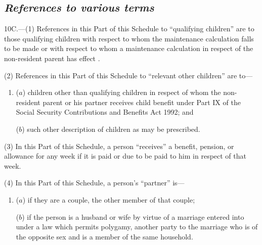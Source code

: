 \documentclass[12pt,a4paper]{article}
\begin{document}

\subsection*{\itshape References to various terms}

10C.---(1) References in this Part of this Schedule to “qualifying children” are to those qualifying children with respect to whom the maintenance calculation falls to be made
or with respect to whom a maintenance calculation in respect of the non-resident parent has effect%
.

(2) References in this Part of this Schedule to “relevant other children” are to—
\begin{enumerate}\item[]
($a$) children other than qualifying children in respect of whom the non-resident parent or his partner receives child benefit under Part IX of the Social Security Contributions and Benefits Act 1992; and

($b$) such other description of children as may be prescribed.
\end{enumerate}

(3) In this Part of this Schedule, a person “receives” a benefit, pension, or allowance for any week if it is paid or due to be paid to him in respect of that week.

(4) In this Part of this Schedule, a person’s “partner” is—
\begin{enumerate}\item[]
($a$) if they are a couple, the other member of that couple;

($b$) if the person is a husband or wife by virtue of a marriage entered into under a law which permits polygamy, another party to the marriage who is of the opposite sex and is a member of the same household.
\end{enumerate}

%
\end{document}
